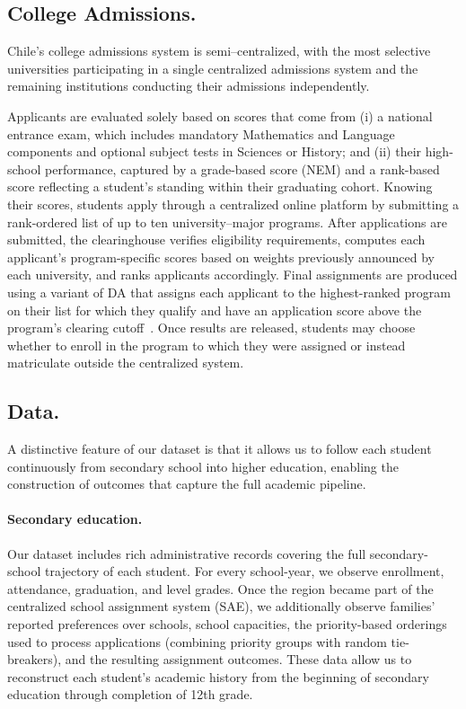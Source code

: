 \documentclass[11pt]{article}
\begin{document}
\subsection{College Admissions.} 
Chile's college admissions system is semi–centralized, with the most selective universities participating in a single centralized admissions system and the remaining institutions conducting their admissions independently. 

Applicants are evaluated solely based on scores that come from (i) a national entrance exam, which includes mandatory Mathematics and Language components and optional subject tests in Sciences or History; and (ii) their high-school performance, captured by a grade-based score (NEM) and a rank-based score reflecting a student's standing within their graduating cohort. Knowing their scores, students apply through a centralized online platform by submitting a rank-ordered list of up to ten university–major programs. After applications are submitted, the clearinghouse verifies eligibility requirements, computes each applicant's program-specific scores based on weights previously announced by each university, and ranks applicants accordingly.
Final assignments are produced using a variant of DA that assigns each applicant to the highest-ranked program on their list for which they qualify and have an application score above the program's clearing cutoff~\citep{rios2021}.
Once results are released, students may choose whether to enroll in the program to which they were assigned or instead matriculate outside the centralized system. 

\subsection{Data.} 
A distinctive feature of our dataset is that it allows us to follow each student continuously from secondary school into higher education, enabling the construction of outcomes that capture the full academic pipeline. 

\paragraph{Secondary education.} 
Our dataset includes rich administrative records covering the full secondary-school trajectory of each student. For every school-year, we observe enrollment, attendance, graduation, and level grades. Once the region became part of the centralized school assignment system (SAE), we additionally observe families' reported preferences over schools, school capacities, the priority-based orderings used to process applications (combining priority groups with random tie-breakers), and the resulting assignment outcomes. These data allow us to reconstruct each student's academic history from the beginning of secondary education through completion of 12th grade.
\end{document}
